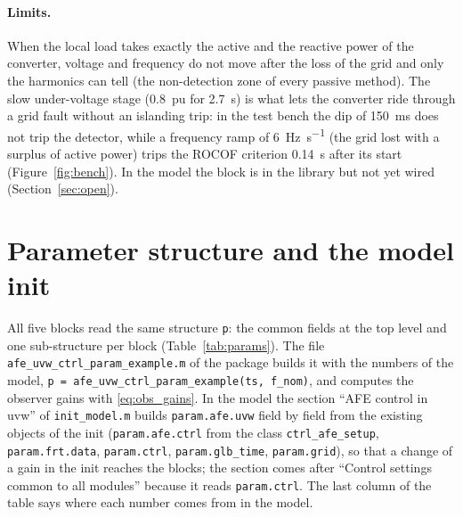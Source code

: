 \documentclass[11pt,a4paper]{scrartcl}
\newcommand{\code}[1]{\texttt{#1}}
\begin{document}
\begin{onehalfspace}
\paragraph{Limits.} When the local load takes exactly the active and the reactive power of the converter, voltage and frequency do not move after the loss of the grid and only the harmonics can tell (the non-detection zone of every passive method). The slow under-voltage stage (\SI{0.8}{pu} for \SI{2.7}{\second}) is what lets the converter ride through a grid fault without an islanding trip: in the test bench the dip of \SI{150}{\milli\second} does not trip the detector, while a frequency ramp of \SI{6}{\hertz\per\second} (the grid lost with a surplus of active power) trips the ROCOF criterion \SI{0.14}{\second} after its start (Figure~\ref{fig:bench}). In the model the block is in the library but not yet wired (Section~\ref{sec:open}).

\section{Parameter structure and the model init}
\label{sec:params}

All five blocks read the same structure \code{p}: the common fields at the top level and one sub-structure per block (Table~\ref{tab:params}). The file \code{afe\_uvw\_ctrl\_param\_example.m} of the package builds it with the numbers of the model, \code{p = afe\_uvw\_ctrl\_param\_example(ts, f\_nom)}, and computes the observer gains with \eqref{eq:obs_gains}. In the model the section ``AFE control in uvw'' of \code{init\_model.m} builds \code{param.afe.uvw} field by field from the existing objects of the init (\code{param.afe.ctrl} from the class \code{ctrl\_afe\_setup}, \code{param.frt.data}, \code{param.ctrl}, \code{param.glb\_time}, \code{param.grid}), so that a change of a gain in the init reaches the blocks; the section comes after ``Control settings common to all modules'' because it reads \code{param.ctrl}. The last column of the table says where each number comes from in the model.


\end{onehalfspace}
\end{document}
